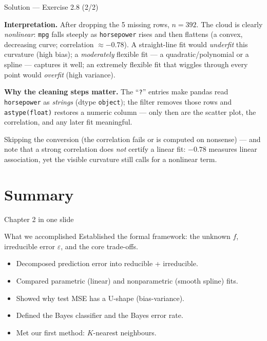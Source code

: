 \documentclass[aspectratio=169,11pt]{beamer}
\begin{document}
\begin{frame}{Solution --- Exercise 2.8 (2/2)}
\begin{solutionbox}
\textbf{Interpretation.} After dropping the 5 missing rows, $n=392$.
The cloud is clearly \emph{nonlinear}: \texttt{mpg} falls steeply as
\texttt{horsepower} rises and then flattens (a convex, decreasing
curve; correlation $\approx-0.78$). A straight-line fit would
\emph{underfit} this curvature (high bias); a \emph{moderately}
flexible fit --- a quadratic/polynomial or a spline --- captures it
well; an extremely flexible fit that wiggles through every point would
\emph{overfit} (high variance).

\textbf{Why the cleaning steps matter.} The ``\texttt{?}'' entries make
pandas read \texttt{horsepower} as \emph{strings} (dtype
\texttt{object}); the filter removes those rows and
\texttt{astype(float)} restores a numeric column --- only then are the
scatter plot, the correlation, and any later fit meaningful.
\end{solutionbox}
\begin{mistake}
Skipping the conversion (the correlation
fails or is computed on nonsense) --- and note that a strong
correlation does \emph{not} certify a linear fit: $-0.78$ measures
linear association, yet the visible curvature still calls for a
nonlinear term.
\end{mistake}
\end{frame}


\section{Summary}

\begin{frame}{Chapter 2 in one slide}
  \begin{block}{What we accomplished}
    Established the formal framework: the unknown $f$, irreducible
    error $\varepsilon$, and the core trade-offs.
  \end{block}
  \begin{itemize}
    \item Decomposed prediction error into reducible + irreducible.
    \item Compared parametric (linear) and nonparametric (smooth
          spline) fits.
    \item Showed why test MSE has a U-shape (bias-variance).
    \item Defined the Bayes classifier and the Bayes error rate.
    \item Met our first method: $K$-nearest neighbours.
  \end{itemize}
\end{frame}
\end{document}
